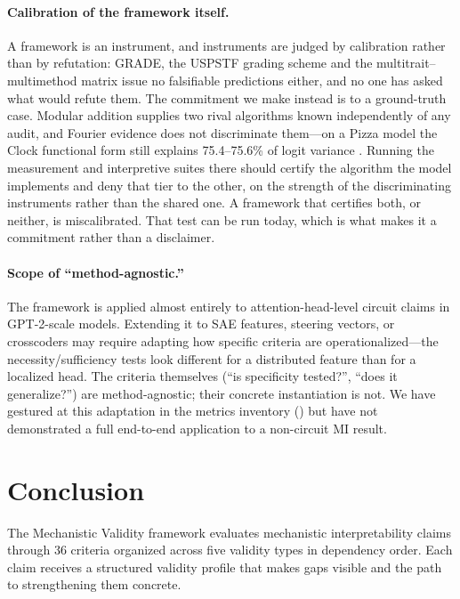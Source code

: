 \documentclass{article}
\begin{document}
\paragraph{Calibration of the framework itself.} A framework is an instrument, and instruments are judged by calibration rather than by refutation: GRADE, the USPSTF grading scheme and the multitrait--multimethod matrix issue no falsifiable predictions either, and no one has asked what would refute them. The commitment we make instead is to a ground-truth case. Modular addition supplies two rival algorithms known independently of any audit, and Fourier evidence does not discriminate them---on a Pizza model the Clock functional form still explains 75.4--75.6\% of logit variance \citep[Table~2]{zhong2023clock}. Running the measurement and interpretive suites there should certify the algorithm the model implements and deny that tier to the other, on the strength of the discriminating instruments rather than the shared one. A framework that certifies both, or neither, is miscalibrated. That test can be run today, which is what makes it a commitment rather than a disclaimer.

\paragraph{Scope of ``method-agnostic.''}  The framework is applied almost entirely to attention-head-level circuit claims in GPT-2-scale models. Extending it to SAE features, steering vectors, or crosscoders may require adapting how specific criteria are operationalized---the necessity/sufficiency tests look different for a distributed feature than for a localized head. The criteria themselves (``is specificity tested?'', ``does it generalize?'') are method-agnostic; their concrete instantiation is not. We have gestured at this adaptation in the metrics inventory () but have not demonstrated a full end-to-end application to a non-circuit MI result.

\section{Conclusion}
\label{sec:conclusion}

The Mechanistic Validity framework evaluates mechanistic interpretability claims through 36 criteria organized across five validity types in dependency order. Each claim receives a structured validity profile that makes gaps visible and the path to strengthening them concrete.
\end{document}
